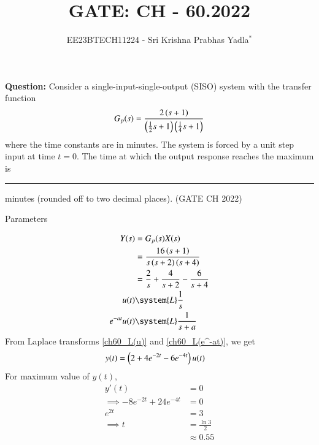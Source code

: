 \documentclass[journal,12pt,twocolumn]{IEEEtran}
\theoremstyle{remark}
\begin{document}

\vspace{3cm}

\title{GATE: CH - 60.2022}
\author{EE23BTECH11224 - Sri Krishna Prabhas Yadla$^{*}$%
}
\maketitle
\newpage
\bigskip

\renewcommand{\thefigure}{\arabic{figure}}
\renewcommand{\thetable}{\arabic{table}}


\vspace{3cm}
\textbf{Question:} Consider a single-input-single-output (SISO) system with the transfer function
\begin{align*}
G_p(s) = \frac{2\left(s+1\right)}{\left(\frac{1}{2}s+1\right)\left(\frac{1}{4}s+1\right)}
\end{align*}
where the time constants are in minutes. The system is forced by a unit step input at
time $t = 0$. The time at which the output response reaches the maximum is \rule{1cm}{0.15mm} minutes (rounded off to two decimal places). \hfill (GATE CH 2022)\\
\solution
\begin{table}[htbp]
	\centering
	\def\arraystretch{1.5}
	
	\caption{Parameters}
	\label{tab:parameters_ch_60}
\end{table}
\begin{align}
Y(s) &= G_p(s)X(s) \\
&= \frac{16\brak{s+1}}{s\brak{s+2}\brak{s+4}}\\
&= \frac{2}{s}+\frac{4}{s+2}-\frac{6}{s+4} \\
\label{ch60_L(u)} u(t) &\system{L} \frac{1}{s} \\
\label{ch60_L(e^-at)} e^{-at} u(t) &\system{L} \frac{1}{s+a}
\end{align}
From Laplace transforms \eqref{ch60_L(u)} and \eqref{ch60_L(e^-at)}, we get
\begin{align}
y(t) &= \left(2+4e^{-2t}-6e^{-4t}\right)u(t)
\end{align}
For maximum value of $y(t)$,
\begin{align}
y'(t) &= 0\\
\implies -8e^{-2t}+24e^{-4t} &= 0\\
e^{2t} &= 3\\
\implies t &= \frac{\ln{3}}{2} \\
&\approx 0.55
\end{align}
\end{document}

